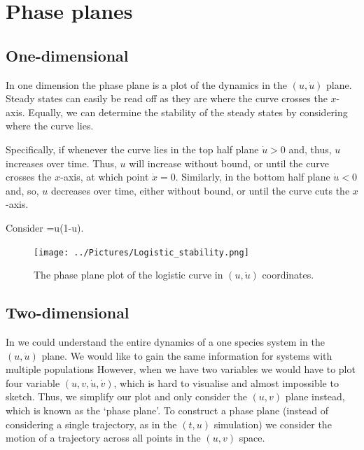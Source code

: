 \section{Phase planes}
\subsection{One-dimensional}\label{One-dimensional}
In one dimension the phase plane is a plot of the dynamics in the $(u,\dot{u})$ plane. Steady states can easily be read off as they are where the curve crosses the $x$-axis. Equally, we can determine the stability of the steady states by considering where the curve lies.

Specifically, if whenever the curve lies in the top half plane $\dot{u}>0$ and, thus, $u$ increases over time. Thus, $u$ will increase without bound, or until the curve crosses the $x$-axis, at which point $\dot{x}=0$. Similarly, in the bottom half plane $\dot{u}<0$ and, so, $u$ decreases over time, either without bound, or until the curve cuts the $x$-axis.

\begin{example}[frametitle=Logistic equation phase plane\label{Logistic_equation_phase_plane}]
Consider
\bb
{}=u(1-u).
\ee
{}
\end{example}
\begin{figure}[!!!h!!!tb]
\centering
\texttt{[image: ../Pictures/Logistic\_stability.png]}
\caption{ \label{Logistic_phase_plane} The phase plane plot of the logistic curve in $(u,\dot{u})$ coordinates.}
\end{figure}

\subsection{Two-dimensional}
In  we could understand the entire dynamics of a one species system in the $(u,\dot{u})$ plane. We would like to gain the same information for systems with multiple populations However, when we have two variables we would have to plot four variable $(u,v,\dot{u},\dot{v})$, which is hard to visualise and almost impossible to sketch. Thus, we simplify our plot and only consider the $(u,v)$ plane instead, which is known as the `phase plane'. To construct a phase plane (instead of considering a single trajectory, as in the $(t,u)$ simulation) we consider the motion of a trajectory across all points in the $(u,v)$ space.

